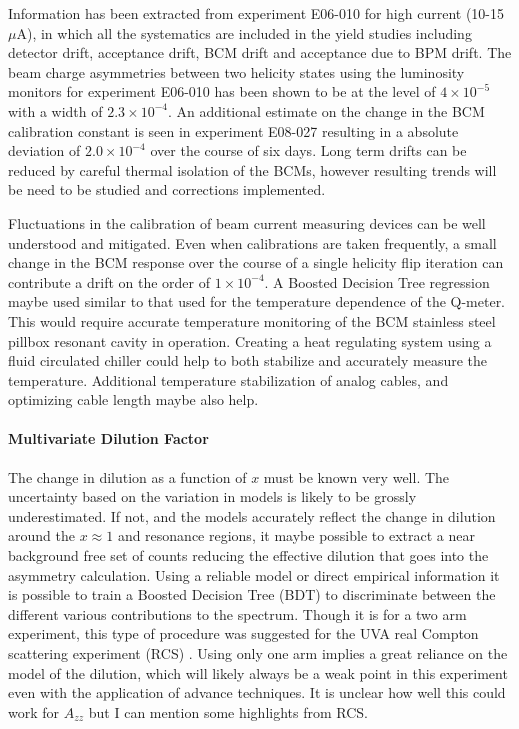 Information has been extracted from experiment E06-010 for high current (10-15 $\mu$A),
in which all the systematics are included in the yield studies including detector
drift, acceptance drift, BCM drift and acceptance due to BPM drift.
The beam charge asymmetries between two helicity states using the luminosity monitors for experiment E06-010 has been shown to be at the level of $4\times10^{-5}$ with a width of $2.3\times10^{-4}$.  An additional estimate on the change in the BCM calibration
constant is seen in experiment E08-027 resulting in a absolute deviation of $2.0\times10^{-4}$ over the course
of six days.  Long term drifts can be reduced by careful thermal isolation of the BCMs, however resulting trends will be need to be studied and corrections implemented.  

Fluctuations in the calibration of beam current measuring devices can be well understood
and mitigated.  Even when calibrations are taken frequently, a small change in the BCM response over
the course of a single helicity flip iteration can contribute a drift on the order of $1\times10^{-4}$.
A Boosted Decision Tree regression maybe used similar to that used for the temperature dependence
of the Q-meter.  This would require accurate temperature monitoring of the BCM stainless steel pillbox
resonant cavity in operation.  Creating a heat regulating system using a fluid circulated chiller could
help to both stabilize and accurately measure the temperature.  Additional temperature stabilization of analog cables, and optimizing cable length maybe also help.


\iffalse
\paragraph{Multivariate Dilution Factor}
The change in dilution as a function of $x$ must be known very well.  The uncertainty based
on the variation in models is likely to be grossly underestimated.  If not, and the models
accurately reflect the change in dilution around the $x \approx 1$ and resonance regions, it maybe
possible to extract a near background free set of counts reducing the effective dilution
that goes into the asymmetry calculation.  Using a reliable model or direct empirical information
it is possible to train a Boosted Decision Tree (BDT) to discriminate between the different various
contributions to the spectrum.  Though it is for a two arm experiment, this type of procedure was
suggested for the UVA real Compton scattering experiment (RCS) \cite{Day}.  Using only one arm implies a
great reliance on the model of the dilution, which will likely always be a weak point in this
experiment even with the application of advance techniques.  It is unclear how well this could
work for $A_{zz}$ but I can mention some highlights from RCS.

